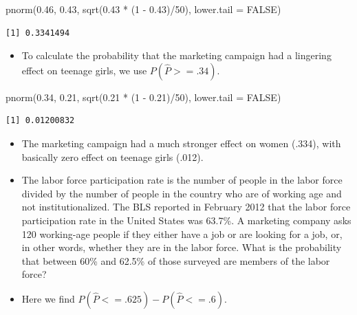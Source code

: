 \documentclass[
  letterpaper,
  DIV=11,
  numbers=noendperiod]{scrreprt}
\newenvironment{Shaded}{\begin{snugshade}}{\end{snugshade}}
\newcommand{\AttributeTok}[1]{\textcolor[rgb]{0.40,0.45,0.13}{#1}}
\newcommand{\ConstantTok}[1]{\textcolor[rgb]{0.56,0.35,0.01}{#1}}
\newcommand{\DecValTok}[1]{\textcolor[rgb]{0.68,0.00,0.00}{#1}}
\newcommand{\FloatTok}[1]{\textcolor[rgb]{0.68,0.00,0.00}{#1}}
\newcommand{\FunctionTok}[1]{\textcolor[rgb]{0.28,0.35,0.67}{#1}}
\newcommand{\NormalTok}[1]{\textcolor[rgb]{0.00,0.23,0.31}{#1}}
\newcommand{\SpecialCharTok}[1]{\textcolor[rgb]{0.37,0.37,0.37}{#1}}
\providecommand{\tightlist}{%
  \setlength{\itemsep}{0pt}\setlength{\parskip}{0pt}}\usepackage{longtable,booktabs,array}
\begin{document}
\begin{Shaded}
\begin{Highlighting}[]
\FunctionTok{pnorm}\NormalTok{(}\FloatTok{0.46}\NormalTok{, }\FloatTok{0.43}\NormalTok{, }\FunctionTok{sqrt}\NormalTok{(}\FloatTok{0.43} \SpecialCharTok{*}\NormalTok{ (}\DecValTok{1} \SpecialCharTok{{-}} \FloatTok{0.43}\NormalTok{)}\SpecialCharTok{/}\DecValTok{50}\NormalTok{), }\AttributeTok{lower.tail =} \ConstantTok{FALSE}\NormalTok{)}
\end{Highlighting}
\end{Shaded}

\begin{verbatim}
[1] 0.3341494
\end{verbatim}

\begin{itemize}
\tightlist
\item
  To calculate the probability that the marketing campaign had a
  lingering effect on teenage girls, we use \(P(\hat{P} >= .34)\).
\end{itemize}

\begin{Shaded}
\begin{Highlighting}[]
\FunctionTok{pnorm}\NormalTok{(}\FloatTok{0.34}\NormalTok{, }\FloatTok{0.21}\NormalTok{, }\FunctionTok{sqrt}\NormalTok{(}\FloatTok{0.21} \SpecialCharTok{*}\NormalTok{ (}\DecValTok{1} \SpecialCharTok{{-}} \FloatTok{0.21}\NormalTok{)}\SpecialCharTok{/}\DecValTok{50}\NormalTok{), }\AttributeTok{lower.tail =} \ConstantTok{FALSE}\NormalTok{)}
\end{Highlighting}
\end{Shaded}

\begin{verbatim}
[1] 0.01200832
\end{verbatim}

\begin{itemize}
\item
  The marketing campaign had a much stronger effect on women (.334),
  with basically zero effect on teenage girls (.012).
\item
  The labor force participation rate is the number of people in the
  labor force divided by the number of people in the country who are of
  working age and not institutionalized. The BLS reported in February
  2012 that the labor force participation rate in the United States was
  63.7\%. A marketing company asks 120 working-age people if they either
  have a job or are looking for a job, or, in other words, whether they
  are in the labor force. What is the probability that between 60\% and
  62.5\% of those surveyed are members of the labor force?
\item
  Here we find \(P(\hat{P} <= .625)-P(\hat{P} <= .6)\).
\end{itemize}
\end{document}
